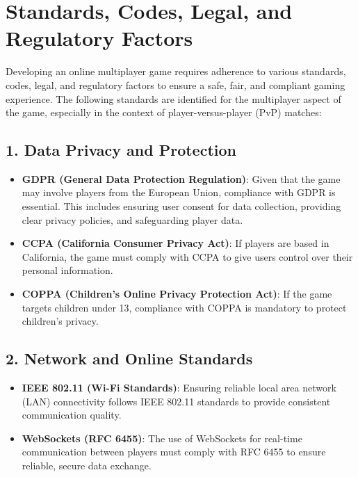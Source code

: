 \section{Standards, Codes, Legal, and Regulatory Factors}    

Developing an online multiplayer game requires adherence to various standards, codes, legal, and regulatory factors to ensure a safe, fair, and compliant gaming experience. The following standards are identified for the multiplayer aspect of the game, especially in the context of player-versus-player (PvP) matches:

\subsection*{1. Data Privacy and Protection}
\begin{itemize}
    \item \textbf{GDPR (General Data Protection Regulation)}: Given that the game may involve players from the European Union, compliance with GDPR is essential. This includes ensuring user consent for data collection, providing clear privacy policies, and safeguarding player data.
    \item \textbf{CCPA (California Consumer Privacy Act)}: If players are based in California, the game must comply with CCPA to give users control over their personal information.
    \item \textbf{COPPA (Children's Online Privacy Protection Act)}: If the game targets children under 13, compliance with COPPA is mandatory to protect children’s privacy.
\end{itemize}

\subsection*{2. Network and Online Standards}
\begin{itemize}
    \item \textbf{IEEE 802.11 (Wi-Fi Standards)}: Ensuring reliable local area network (LAN) connectivity follows IEEE 802.11 standards to provide consistent communication quality.
    \item \textbf{WebSockets (RFC 6455)}: The use of WebSockets for real-time communication between players must comply with RFC 6455 to ensure reliable, secure data exchange.
\end{itemize}

